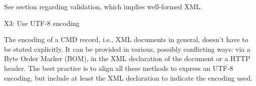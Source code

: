 See section  regarding validation, which implies well-formed XML.

X3: Use UTF-8 encoding



The encoding of a CMD record, i.e., XML documents in general, doesn't have to be stated explicitly. It can be provided in various, possibly conflicting ways: via a Byte Order Marker (BOM), in the XML declaration of the document or a HTTP header. The best practice is to align all these methods to express an UTF-8 encoding, but include at least the XML declaration to indicate the encoding used.
